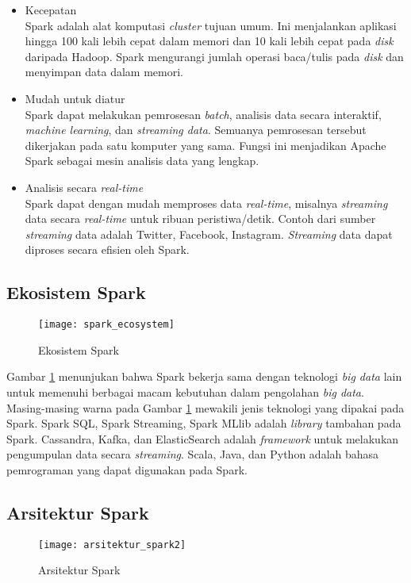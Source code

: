 \begin{itemize}
\item Kecepatan\\
Spark adalah alat komputasi \textit{cluster} tujuan umum. Ini menjalankan aplikasi hingga 100 kali lebih cepat dalam memori dan 10 kali lebih cepat pada \textit{disk} daripada Hadoop. Spark mengurangi jumlah operasi baca/tulis pada \textit{disk} dan menyimpan data dalam memori.

\item Mudah untuk diatur\\	
Spark dapat melakukan pemrosesan \textit{batch}, analisis data secara interaktif, \textit{machine learning}, dan \textit{streaming data}. Semuanya pemrosesan tersebut dikerjakan pada satu komputer yang sama. Fungsi ini menjadikan Apache Spark sebagai mesin analisis data yang lengkap. 

\item Analisis secara \textit{real-time}\\
Spark dapat dengan mudah memproses data \textit{real-time}, misalnya \textit{streaming} data secara \textit{real-time} untuk ribuan peristiwa/detik. Contoh dari sumber \textit{streaming} data adalah Twitter, Facebook, Instagram. \textit{Streaming} data dapat diproses secara efisien oleh Spark.
\end{itemize}

\subsection{Ekosistem Spark}
\begin{figure}[H]
	\centering
	\texttt{[image: spark\_ecosystem]}
	\caption{Ekosistem Spark}
	\label{fig:spark_ecosystem}
\end{figure}
Gambar \ref{fig:spark_ecosystem} menunjukan bahwa Spark bekerja sama dengan teknologi \textit{big data} lain untuk memenuhi berbagai macam kebutuhan dalam pengolahan \textit{big data}. Masing-masing warna pada Gambar \ref{fig:spark_ecosystem} mewakili jenis teknologi yang dipakai pada Spark. Spark SQL, Spark Streaming, Spark MLlib adalah \textit{library} tambahan pada Spark. Cassandra, Kafka, dan ElasticSearch adalah \textit{framework} untuk melakukan pengumpulan data secara \textit{streaming}. Scala, Java, dan Python adalah bahasa pemrograman yang dapat digunakan pada Spark.

\subsection{Arsitektur Spark}
\label{sec:arsitektur_spark}
\begin{figure}[H]
	\centering
	\texttt{[image: arsitektur\_spark2]}
	\caption{Arsitektur Spark}
	\label{fig:arsitektur_spark2}
\end{figure}

